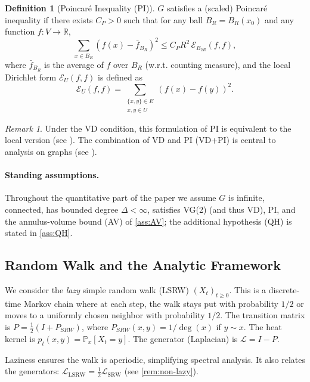 \documentclass[reqno]{amsart}
\numberwithin{equation}{section}
\theoremstyle{definition}
\newtheorem{definition}[definition]{Definition}
\theoremstyle{remark}
\newtheorem{remark}[remark]{Remark}
\newcommand{\Cref}[1]{\autoref{#1}}
\newcommand{\cE}{\mathcal{E}}
\newcommand{\LL}{\mathcal{L}}
\newcommand{\R}{\mathbb{R}}
\newcommand{\Prob}{\mathbb{P}}
\begin{document}
\begin{definition}[Poincaré Inequality (PI)]\label{def:PI}
$G$ satisfies a (scaled) Poincaré inequality if there exists $C_P > 0$ such that for any ball $B_R=B_R(x_0)$ and any function $f: V \to \R$,
\[
\sum_{x \in B_R} (f(x) - \bar{f}_{B_R})^2 \leq C_P R^2 \, \cE_{B_{2R}}(f,f),
\]
where $\bar{f}_{B_R}$ is the average of $f$ over $B_R$ (w.r.t. counting measure), and the local Dirichlet form $\cE_U(f,f)$ is defined as
\[
\cE_U(f,f) = \sum_{\substack{\{x,y\} \in E \\ x,y \in U}} (f(x)-f(y))^2.
\]
\end{definition}

\begin{remark}\label{rem:PI_equivalence}
Under the VD condition, this formulation of PI is equivalent to the local version (see \cite{HajlaszKoskela00}). The combination of VD and PI (VD+PI) is central to analysis on graphs (see \cite{GrigoryanTelcs12}).
\end{remark}

\paragraph{Standing assumptions.} Throughout the quantitative part of the paper we assume $G$ is infinite, connected, has bounded degree $\Delta < \infty$, satisfies VG(2) (and thus VD), PI, and the annulus-volume bound (AV) of \Cref{ass:AV}; the additional hypothesis (QH) is stated in \Cref{ass:QH}.

\subsection{Random Walk and the Analytic Framework}

We consider the \emph{lazy} simple random walk (LSRW) $(X_t)_{t \geq 0}$. This is a discrete-time Markov chain where at each step, the walk stays put with probability $1/2$ or moves to a uniformly chosen neighbor with probability $1/2$. The transition matrix is $P = \frac{1}{2}(I + P_{SRW})$, where $P_{SRW}(x,y) = 1/\deg(x)$ if $y \sim x$. The heat kernel is $p_t(x,y) = \Prob_x[X_t = y]$. The generator (Laplacian) is $\LL = I - P$.

Laziness ensures the walk is aperiodic, simplifying spectral analysis. It also relates the generators: $\LL_{\text{LSRW}} = \frac{1}{2} \LL_{\text{SRW}}$ (see \Cref{rem:non-lazy}).
\end{document}
